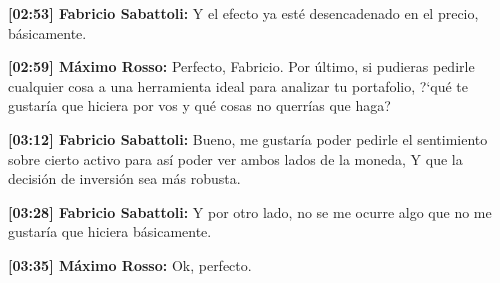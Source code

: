 \par\noindent\textbf{[02:53] Fabricio Sabattoli:} Y el efecto ya esté desencadenado en el precio, básicamente.
\par\noindent\textbf{[02:59] Máximo Rosso:} Perfecto, Fabricio. Por último, si pudieras pedirle cualquier cosa a una herramienta ideal para analizar tu portafolio, ?`qué te gustaría que hiciera por vos y qué cosas no querrías que haga?
\par\noindent\textbf{[03:12] Fabricio Sabattoli:} Bueno, me gustaría poder pedirle el sentimiento sobre cierto activo para así poder ver ambos lados de la moneda, Y que la decisión de inversión sea más robusta.
\par\noindent\textbf{[03:28] Fabricio Sabattoli:} Y por otro lado, no se me ocurre algo que no me gustaría que hiciera básicamente.
\par\noindent\textbf{[03:35] Máximo Rosso:} Ok, perfecto.

\label{annex:entrevista-octavio}

